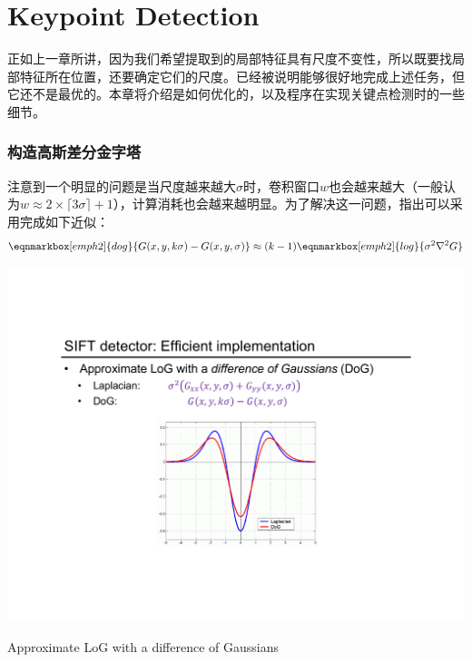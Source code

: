 \part{Keypoint Detection}\label{part:Keypoint detection}

正如上一章所讲，因为我们希望提取到的局部特征具有尺度不变性，所以既要找局部特征所在位置，还要确定它们的尺度。\lpl 已经被说明能够很好地完成上述任务，但它还不是最优的。本章将介绍\sift 是如何优化的，以及程序在实现关键点检测时的一些细节。

\section{构造高斯差分金字塔}

\sift 注意到一个明显的问题是当\lpl 尺度越来越大$\sigma$时，卷积窗口$w$也会越来越大（一般认为$w\approx 2\times\lceil 3\sigma\rceil + 1$），计算消耗也会越来越明显。为了解决这一问题，\sift 指出可以采用\DoG 完成如下近似：
\begin{equation}
	\eqnmarkbox[emph2]{dog}{G(x,y,k\sigma) - G(x,y,\sigma)} \approx (k-1)\eqnmarkbox[emph2]{log}{\sigma^2\nabla^2 G}
\end{equation}

\begin{marginfigure}
	\centering
	\includegraphics[width=\textwidth]{fig/Approximate LoG with a difference of Gaussians.pdf}
	\caption{Approximate LoG with a difference of Gaussians}
\end{marginfigure}

